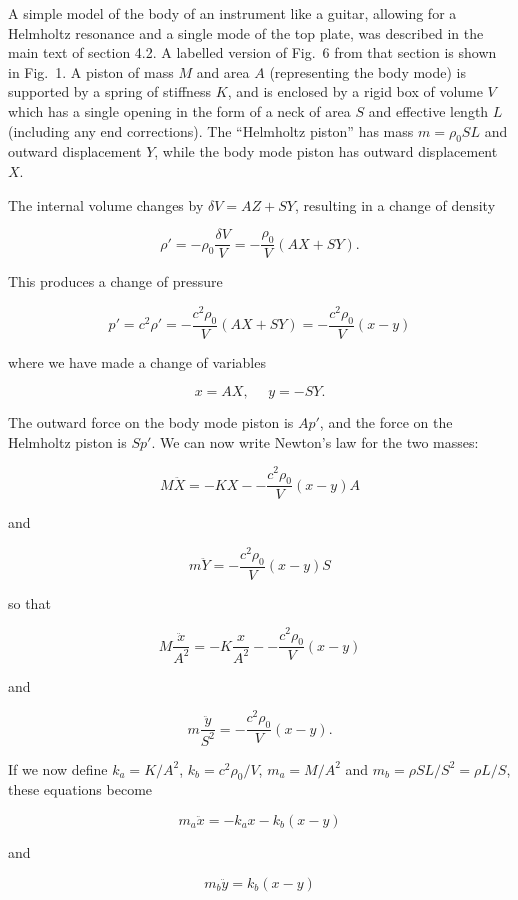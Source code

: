   A simple model of the body of an instrument like a guitar, allowing for a 
  Helmholtz resonance and a single mode of the top plate, was described in the 
  main text of section 4.2. A labelled version of Fig.\ 6 from that section is 
  shown in Fig.\ 1. A piston of mass $M$ and area $A$ (representing the body 
  mode) is supported by a spring of stiffness $K$, and is enclosed by a rigid 
  box of volume $V$ which has a single opening in the form of a neck of area 
  $S$ and effective length $L$ (including any end corrections). The ``Helmholtz 
  piston'' has mass $m=\rho_0 SL$ and outward displacement $Y$, while the body 
  mode piston has outward displacement $X$. 


  The internal volume changes by $\delta V = AZ + SY$, resulting in a change of 
  density 

  $$\rho' = -\rho_0 \dfrac{\delta V}{V}=-\dfrac{\rho_0}{V} (AX+SY) . \tag{1}$$ 

  This produces a change of pressure 

  $$p' = c^2 \rho' =- \dfrac{c^2 \rho_0}{V} (AX+SY)=- \dfrac{c^2 \rho_0}{V} 
  (x-y) \tag{12}$$ 

  where we have made a change of variables 

  $$x=AX,\mathrm{~~~~~~}y=-SY . \tag{3}$$ 

  The outward force on the body mode piston is $Ap'$, and the force on the 
  Helmholtz piston is $Sp'$. We can now write Newton's law for the two masses: 

  $$M \ddot{X}=-KX -- \dfrac{c^2 \rho_0}{V} (x-y)A \tag{4}$$ 

  and 

  $$m \ddot{Y}=- \dfrac{c^2 \rho_0}{V} (x-y)S \tag{5}$$ 

  so that 

  $$M \dfrac{\ddot{x}}{A^2}=-K\dfrac{x}{A^2} -- \dfrac{c^2 \rho_0}{V} (x-y) 
  \tag{6}$$ 

  and 

  $$m \dfrac{\ddot{y}}{S^2}=- \dfrac{c^2 \rho_0}{V} (x-y) . \tag{7}$$ 

  If we now define $k_a=K/A^2$, $k_b=c^2 \rho_0/V$, $m_a=M/A^2$ and $m_b=\rho 
  SL/S^2 =\rho L/S$, these equations become 

  $$m_a \ddot{x}=-k_a x -k_b(x-y) \tag{8}$$ 

  and 

  $$m_b \ddot{y}=k_b (x-y) \tag{9}$$ 

